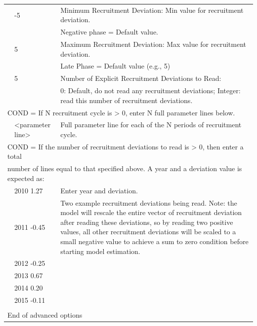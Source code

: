\begin{longtable}{p{1cm} p{3cm} p{12cm}}
	\Tstrut & -5   & Minimum Recruitment Deviation: Min value for recruitment deviation. \\
			&	   & Negative phase = Default value. \\

	\Tstrut & 5	   & Maximum Recruitment Deviation: Max value for recruitment deviation. \\
			&	   & Late Phase = Default value (e.g., 5) \\
	
	\Tstrut & 5   & Number of Explicit Recruitment Deviations to Read: \\
			&      & 0: Default, do not read any recruitment deviations; Integer: read this number of recruitment deviations. \\

	\multicolumn{3}{l}{COND = If N recruitment cycle is > 0, enter N full parameter lines below.} \Tstrut\\
	\Tstrut & <parameter line> & Full parameter line for each of the N periods of recruitment cycle. \Bstrut\\
	\hline

	\multicolumn{3}{l}{COND = If the number of recruitment deviations to read is > 0, then enter a total} \Tstrut\\
	\multicolumn{3}{l}{number of lines equal to that specified above. A year and a deviation value is expected as:} \Bstrut\\
	& 2010 1.27 & Enter year and deviation. \\
	& 2011 -0.45 & \multirow{1}{1cm}[-0.25cm]{\parbox{10cm}{Two example recruitment deviations being read. Note: the model will rescale the entire vector of recruitment deviation after reading these deviations, so by reading two positive values, all other recruitment deviations will be scaled to a small negative value to achieve a sum to zero condition before starting model estimation.}} \\
	& 2012 -0.25 & \\
	& 2013 0.67 & \\
	& 2014 0.20 & \\
	& 2015 -0.11 & \\
	& & \\
	\hline
	
		
	\multicolumn{3}{l}{End of advanced options} \Tstrut\Bstrut\\
	\hline
	
\end{longtable}

